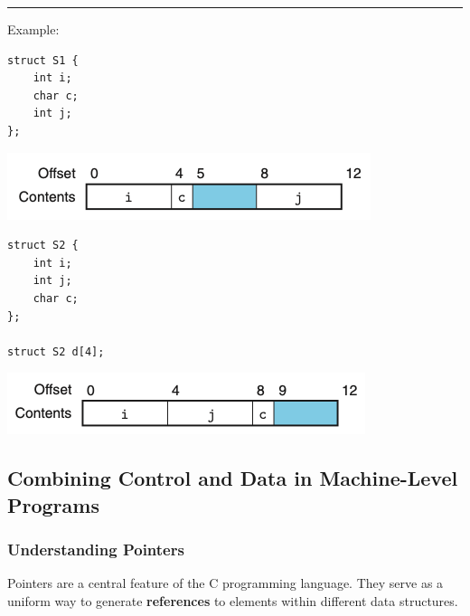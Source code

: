 \documentclass[11pt]{article}
\begin{document}
\noindent\rule{\textwidth}{0.5pt}
Example:\\

\begin{verbatim}
struct S1 {
    int i;
    char c;
    int j;
};
\end{verbatim}

\begin{center}
\includegraphics[width=.9\linewidth]{pics/data-alignment-1.png}
\end{center}

\begin{verbatim}
struct S2 {
    int i;
    int j;
    char c;
};

struct S2 d[4];
\end{verbatim}

\begin{center}
\includegraphics[width=.9\linewidth]{pics/data-alignment-2.png}
\end{center}

\subsection{Combining Control and Data in Machine-Level Programs}
\label{sec:orgb3c8691}

\subsubsection{Understanding Pointers}
\label{sec:org36b8aa4}
Pointers are a central feature of the C programming language. They serve as a uniform way to generate \textbf{references} to elements within different data structures.\\
\end{document}

